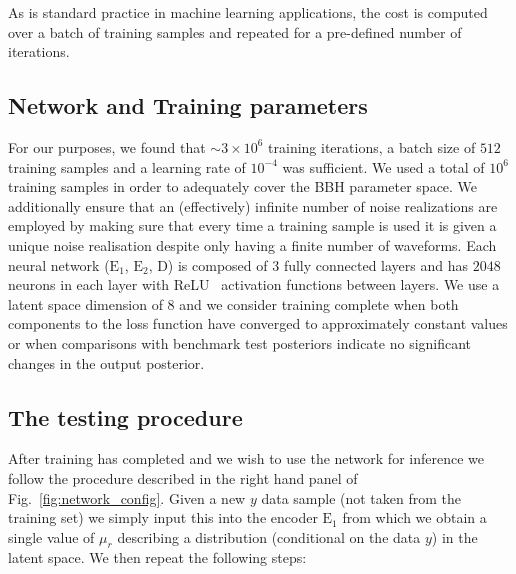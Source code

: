\documentclass[%
showpacs,
 amsmath,amssymb,
 aps,
 twocolumn,
 prl,
 reprint,
floatfix,
]{revtex4-1}
\newcommand{\chris}[1]{\textbf{\textcolor{red}{CHRIS: #1}}}
\begin{document}
%
%
As is standard practice in machine learning applications, the cost
is computed over a batch of training samples and repeated for a pre-defined
number of iterations. 


\subsection{Network and Training parameters}
%
%
For our purposes, we found that $\sim3\times10^6$ training iterations, a batch
size of $512$ training samples and a learning rate of $10^{-4}$ was sufficient.
We used a total of $10^6$ training samples in order to adequately cover the
\ac{BBH} parameter space. We additionally ensure that an (effectively) infinite
number of noise realizations are employed by making sure that every time a
training sample is used it is given a unique noise realisation despite only
having a finite number of waveforms. Each neural network ($\text{E}_1$,
$\text{E}_2$, D) is composed of 3 fully connected layers and has $2048$ neurons
in each layer with ReLU~\cite{nair2010rectified} activation functions between
layers. We use a latent space dimension of $8$ and we consider training
complete when both components to the loss function have converged to
approximately constant values or when comparisons with benchmark test
posteriors indicate no significant changes in the output posterior.

\subsection{The testing procedure}
%
%
%
After training has completed and we wish to use the network for inference we
follow the procedure described in the right hand panel of
Fig.~\ref{fig:network_config}. Given a new $y$ data sample (not taken from the
training set) we simply input this into the encoder $\textrm{E}_1$ from which we
obtain a single value of $\mu_{r}$ describing a distribution (conditional on the
data $y$) in the latent space. We then repeat the following steps:
\end{document}
